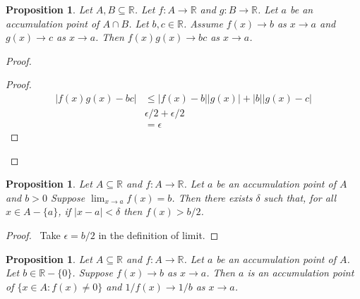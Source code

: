 \documentclass{article}
\let\qed\relax
\newtheorem{proposition}[axiom]{Proposition}
\theoremstyle{definition}
\begin{document}
\begin{proposition}
    \label{proposition:multiplication_limit}
    Let $A, B \subseteq \mathbb{R}$. Let $f : A \rightarrow \mathbb{R}$ and $g : B \rightarrow \mathbb{R}$. Let $a$ be an accumulation
    point of $A \cap B$. Let $b, c \in \mathbb{R}$. Assume $f(x) \rightarrow b$ as $x \rightarrow a$ and $g(x) \rightarrow c$
    as $x \rightarrow a$. Then $f(x) g(x) \rightarrow b c$ as $x \rightarrow a$.
\end{proposition}

\begin{proof}
    \pf
    \begin{proof}
        \pf
        \begin{align*}
            |f(x)g(x) - bc| & \leq |f(x) - b||g(x)| + |b||g(x)-c| \\
            & \epsilon/2 + \epsilon / 2 \\
            & = \epsilon
        \end{align*}
    \end{proof}
    \qed
\end{proof}

\begin{proposition}
    \label{proposition:positive_neighbourhood}
    Let $A \subseteq \mathbb{R}$ and $f : A \rightarrow \mathbb{R}$. Let $a$ be an accumulation point of $A$ and $b > 0$
    Suppose $\lim_{x \rightarrow a} f(x) = b$. Then there exists $\delta$ such that, for all $x \in A - \{a\}$, if $|x-a| < \delta$ then
    $f(x) > b/2$.
\end{proposition}

\begin{proof}
    \pf\ Take $\epsilon = b / 2$ in the definition of limit. \qed
\end{proof}

\begin{proposition}
    \label{proposition:inverse_limit}
    Let $A \subseteq \mathbb{R}$ and $f : A \rightarrow \mathbb{R}$. Let $a$ be an accumulation point of $A$. Let $b \in \mathbb{R} - \{0\}$.
    Suppose $f(x) \rightarrow b$ as $x \rightarrow a$. Then $a$ is an accumulation point of $\{ x \in A : f(x) \neq 0 \}$
    and $1 / f(x) \rightarrow 1/b$ as $x \rightarrow a$.
\end{proposition}
\end{document}
